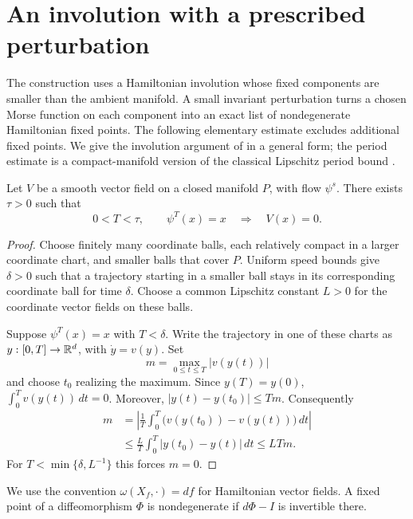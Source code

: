 \section{An involution with a prescribed perturbation}
\label{inv:section}
\label{sec:involution}

The construction uses a Hamiltonian involution whose fixed components
are smaller than the ambient manifold. A small invariant perturbation
turns a chosen Morse function on each component into an exact list of
nondegenerate Hamiltonian fixed points. The following elementary estimate
excludes additional fixed points. We give the involution argument of
\cite[Proposition~4.2]{OpenAI2026Stable} in a general form; the period estimate is a
compact-manifold version of the classical Lipschitz period bound
\cite{Yorke1969}.

\begin{lemma}\label{inv:short-period}
Let $V$ be a smooth vector field on a closed manifold $P$, with flow
$\psi^s$. There exists $\tau>0$ such that
\[
  0<T<\tau,\qquad \psi^T(x)=x
  \quad\Longrightarrow\quad V(x)=0.
\]
\end{lemma}

\begin{proof}
Choose finitely many coordinate balls, each relatively compact in a
larger coordinate chart, and smaller balls that cover $P$. Uniform speed
bounds give $\delta>0$ such that a trajectory starting in a smaller ball
stays in its corresponding coordinate ball for time $\delta$. Choose
a common Lipschitz constant $L>0$ for the coordinate vector fields on
these balls.

Suppose $\psi^T(x)=x$ with $T<\delta$. Write the trajectory in one of
these charts as $y:[0,T]\to\mathbb R^d$, with $\dot y=v(y)$. Set
\[
  m=\max_{0\leq t\leq T}|v(y(t))|
\]
and choose $t_0$ realizing the maximum. Since $y(T)=y(0)$,
$\int_0^T v(y(t))\,dt=0$. Moreover,
$|y(t)-y(t_0)|\leq Tm$. Consequently
\[
\begin{split}
  m
  &=\left|\frac1T\int_0^T
       \bigl(v(y(t_0))-v(y(t))\bigr)\,dt\right|\\
  &\leq\frac LT\int_0^T|y(t_0)-y(t)|\,dt
   \leq LTm.
\end{split}
\]
For $T<\min\{\delta,L^{-1}\}$ this forces $m=0$.
\end{proof}

We use the convention $\omega(X_f,\cdot)=df$ for Hamiltonian vector
fields. A fixed point of a diffeomorphism $\Phi$ is nondegenerate if
$d\Phi-I$ is invertible there.

